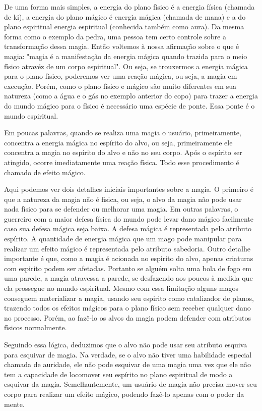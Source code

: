 De uma forma mais simples, a energia do plano físico é a energia física (chamada de ki), a energia do plano mágico é energia mágica (chamada de mana) e a do plano espiritual energia espiritual (conhecida também como aura). Da mesma forma como o exemplo da pedra, uma pessoa tem certo controle sobre a transformação dessa magia. Então voltemos à nossa afirmação sobre o que é magia: "magia é a manifestação da energia mágica quando trazida para o meio físico atravéz de um corpo espiritual". Ou seja, se trouxermos a energia mágica para o plano físico, poderemos ver uma reação mágica, ou seja, a magia em execução. Porém, como o plano físico e mágico são muito diferentes em sua natureza (como a água e o gás no exemplo anterior do copo) para trazer a energia do mundo mágico para o físico é necessário uma espécie de ponte. Essa ponte é o mundo espiritual. 

Em poucas palavras, quando se realiza uma magia o usuário, primeiramente, concentra a energia mágica no espírito do alvo, ou seja, primeiramente ele concentra a magia no espírito do alvo e não no seu corpo. Após o espírito ser atingido, ocorre imediatamente uma reação física. Todo esse procedimento é chamado de efeito mágico.

Aqui podemos ver dois detalhes iniciais importantes sobre a magia. O primeiro é que a natureza da magia não é fisica, ou seja, o alvo da magia não pode usar nada físico para se defender ou melhorar uma magia. Em outras palavras, o guerreiro com a maior defesa física do mundo pode levar dano mágico facilmente caso sua defesa mágica seja baixa. A defesa mágica é representada pelo atributo espírito. A quantidade de energia mágica que um mago pode manipular para realizar um efeito mágico é representada pelo atributo sabedoria. Outro detalhe importante é que, como a magia é acionada no espirito do alvo, apenas criaturas com espirito podem ser afetadas. Portanto se alguém solta uma bola de fogo em uma parede, a magia atravessa a parede, se desfazendo aos poucos à medida que ela prossegue no mundo espiritual. Mesmo com essa limitação alguns magos conseguem materializar a magia, usando seu espirito como catalizador de planos, trazendo todos os efeitos mágicos para o plano físico sem receber qualquer dano no processo. Porém, ao fazê-lo os alvos da magia podem defender com atributos físicos normalmente. 

Seguindo essa lógica, deduzimos que o alvo não pode usar seu atributo esquiva para esquivar de magia. Na verdade, se o alvo não tiver uma habilidade especial chamada de auridade, ele não pode esquivar de uma magia uma vez que ele não tem a capacidade de locomover seu espírito no plano espiritual de modo a esquivar da magia. Semelhantemente, um usuário de magia não precisa mover seu corpo para realizar um efeito mágico, podendo fazê-lo apenas com o poder da mente.

